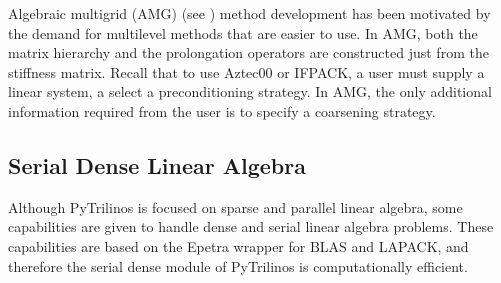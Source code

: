 \documentclass[10pt,relax]{SANDreport}
\begin{document}
Algebraic multigrid (AMG)  (see \cite[Section 8]{Briggs2000}) method
development has been motivated by the demand for multilevel methods that are
easier to use.  In AMG, both the matrix hierarchy and the prolongation
operators are constructed just from the stiffness matrix.  Recall that to use
Aztec00 or IFPACK,  a user must supply a linear system, a select a
preconditioning strategy.  In AMG, the only additional information required
from the user is to specify a coarsening strategy.

\subsection{Serial Dense Linear Algebra}
\label{sec:serialdense}

Although PyTrilinos is focused on sparse and parallel linear algebra, some
capabilities are given to handle dense and serial linear algebra problems.
These capabilities are based on the Epetra wrapper for BLAS and LAPACK, and
therefore the serial dense module of PyTrilinos is computationally efficient.
\end{document}
